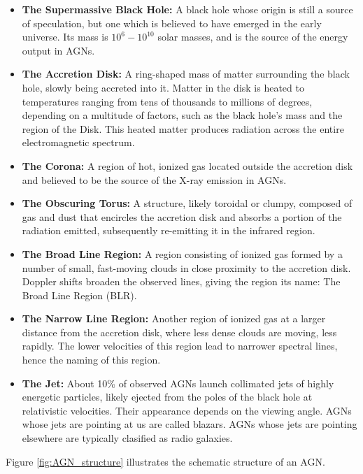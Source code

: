 \begin{itemize}
    \item \textbf{The Supermassive Black Hole:} A black hole whose origin is still a source of speculation, but one which is believed to have emerged in the early universe. Its mass is $10^6 - 10^{10}$ solar masses, and is the source of the energy output in AGNs.
    \item \textbf{The Accretion Disk:} A ring-shaped mass of matter surrounding the black hole, slowly being accreted into it. Matter in the disk is heated to temperatures ranging from tens of thousands to millions of degrees, depending on a multitude of factors, such as the black hole's mass and the region of the Disk. This heated matter produces radiation across the entire electromagnetic spectrum.
    \item \textbf{The Corona:} A region of hot, ionized gas located outside the accretion disk and believed to be the source of the X-ray emission in AGNs.
    \item \textbf{The Obscuring Torus:} A structure, likely toroidal or clumpy, composed of gas and dust that encircles the accretion disk and absorbs a portion of the radiation emitted, subsequently re-emitting it in the infrared region.
    \item \textbf{The Broad Line Region:} A region consisting of ionized gas formed by a number of small, fast-moving clouds in close proximity to the accretion disk. Doppler shifts broaden the observed lines, giving the region its name: The Broad Line Region (BLR).
    \item \textbf{The Narrow Line Region:} Another region of ionized gas at a larger distance from the accretion disk, where less dense clouds are moving, less rapidly. The lower velocities of this region lead to narrower spectral lines, hence the naming of this region.
    \item \textbf{The Jet:} About 10\% of observed AGNs launch collimated jets of highly energetic particles, likely ejected from the poles of the black hole at relativistic velocities. Their appearance depends on the viewing angle. AGNs whose jets are pointing at us are called blazars. AGNs whose jets are pointing elsewhere are typically clasified as radio galaxies.
\end{itemize}

Figure \ref{fig:AGN_structure} illustrates the schematic structure of an AGN.

